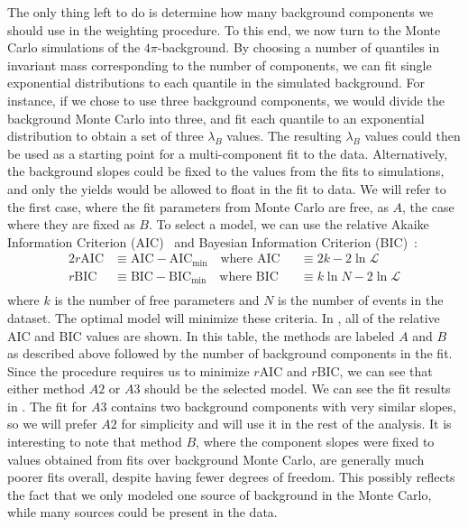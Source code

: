 The only thing left to do is determine how many background components we should use in the weighting procedure. To this end, we now turn to the Monte Carlo simulations of the $4\pi$-background. By choosing a number of quantiles in invariant mass corresponding to the number of components, we can fit single exponential distributions to each quantile in the simulated background. For instance, if we chose to use three background components, we would divide the background Monte Carlo into three, and fit each quantile to an exponential distribution to obtain a set of three $\lambda_B$ values. The resulting  $\lambda_B$ values could then be used as a starting point for a multi-component fit to the data. Alternatively, the background slopes could be fixed to the values from the fits to simulations, and only the yields would be allowed to float in the fit to data. We will refer to the first case, where the fit parameters from Monte Carlo are free, as $A$, the case where they are fixed as $B$. To select a model, we can use the relative Akaike Information Criterion (AIC)~\cite{akaike_information_1998} and Bayesian Information Criterion (BIC)~\cite{schwarz_estimating_1978}:
\begin{alignat}{2}
  r\text{AIC} &\equiv \text{AIC} - \text{AIC}_\text{min} \quad\text{where } \text{AIC} &&\equiv 2k - 2\ln\mathcal{L} \\
  r\text{BIC} &\equiv \text{BIC} - \text{BIC}_\text{min} \quad\text{where } \text{BIC} &&\equiv k\ln{N} - 2\ln\mathcal{L} \\
  \label{eq:information-criteria}
\end{alignat}
where $k$ is the number of free parameters and $N$ is the number of events in the dataset. The optimal model will minimize these criteria. In , all of the relative AIC and BIC values are shown. In this table, the methods are labeled $A$ and $B$ as described above followed by the number of background components in the fit. Since the procedure requires us to minimize $r\text{AIC}$ and $r\text{BIC}$, we can see that either method $A2$ or $A3$ should be the selected model. We can see the fit results in . The fit for $A3$ contains two background components with very similar slopes, so we will prefer $A2$ for simplicity and will use it in the rest of the analysis. It is interesting to note that method $B$, where the component slopes were fixed to values obtained from fits over background Monte Carlo, are generally much poorer fits overall, despite having fewer degrees of freedom. This possibly reflects the fact that we only modeled one source of background in the Monte Carlo, while many sources could be present in the data.

